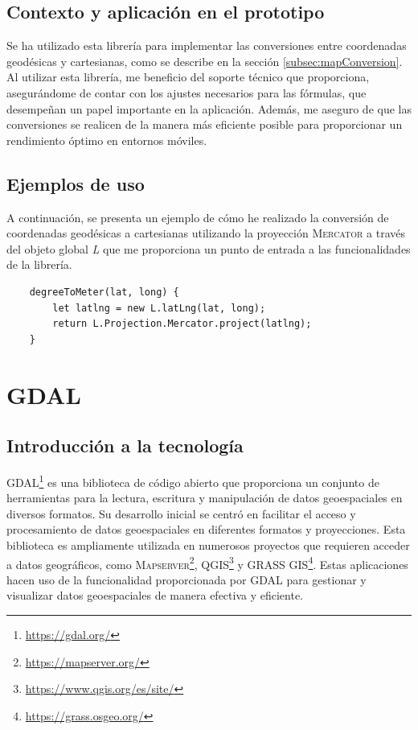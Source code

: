 \documentclass[a4paper, 11pt]{book}
\begin{document}
\subsection{Contexto y aplicación en el prototipo}
Se ha utilizado esta librería para implementar las conversiones entre coordenadas geodésicas y cartesianas, como se describe en la sección \ref{subsec:mapConversion}. Al utilizar esta librería, me beneficio del soporte técnico que proporciona, asegurándome de contar con los ajustes necesarios para las fórmulas, que desempeñan un papel importante en la aplicación. Además, me aseguro de que las conversiones se realicen de la manera más eficiente posible para proporcionar un rendimiento óptimo en entornos móviles.
\subsection{Ejemplos de uso}
A continuación, se presenta un ejemplo de cómo he realizado la conversión de coordenadas geodésicas a cartesianas utilizando la proyección \textsc{Mercator} a través del objeto global \emph{L} que me proporciona un punto de entrada a las funcionalidades de la librería.
\begin{verbatim}
	degreeToMeter(lat, long) {
		let latlng = new L.latLng(lat, long);
		return L.Projection.Mercator.project(latlng);
	}
\end{verbatim}
\section{GDAL}
\subsection{Introducción a la tecnología}
\textsc{GDAL}\footnote{\url{https://gdal.org/}} es una biblioteca de código abierto que proporciona un conjunto de herramientas para la lectura, escritura y manipulación de datos geoespaciales en diversos formatos. Su desarrollo inicial se centró en facilitar el acceso y procesamiento de datos geoespaciales en diferentes formatos y proyecciones.
Esta biblioteca es ampliamente utilizada en numerosos proyectos que requieren acceder a datos geográficos, como \textsc{Mapserver}\footnote{\url{https://mapserver.org/}}, \textsc{QGIS}\footnote{\url{https://www.qgis.org/es/site/}} y \textsc{GRASS GIS}\footnote{\url{https://grass.osgeo.org/}}. Estas aplicaciones hacen uso de la funcionalidad proporcionada por \textsc{GDAL} para gestionar y visualizar datos geoespaciales de manera efectiva y eficiente.
\end{document}
